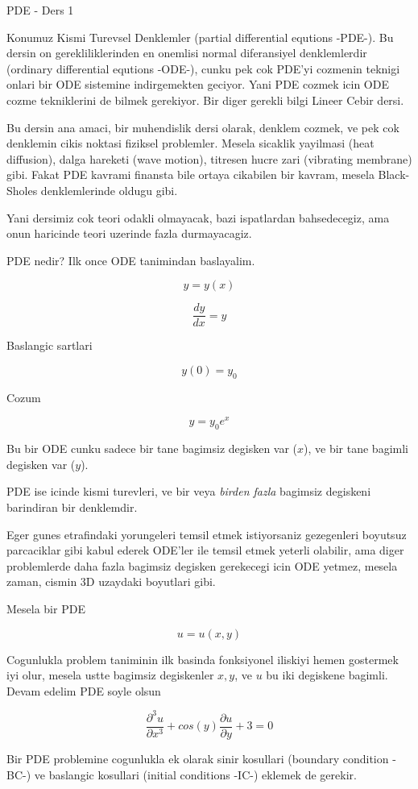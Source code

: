 \documentclass[12pt,fleqn]{article}
\begin{document}
PDE - Ders 1

Konumuz Kismi Turevsel Denklemler (partial differential equtions -PDE-). Bu
dersin on gerekliliklerinden en onemlisi normal diferansiyel denklemlerdir
(ordinary differential equtions -ODE-), cunku pek cok PDE'yi cozmenin
teknigi onlari bir ODE sistemine indirgemekten geciyor. Yani PDE cozmek
icin ODE cozme tekniklerini de bilmek gerekiyor. Bir diger gerekli bilgi
Lineer Cebir dersi.

Bu dersin ana amaci, bir muhendislik dersi olarak, denklem cozmek, ve pek
cok denklemin cikis noktasi fiziksel problemler. Mesela sicaklik yayilmasi
(heat diffusion), dalga hareketi (wave motion), titresen hucre zari
(vibrating membrane) gibi. Fakat PDE kavrami finansta bile ortaya cikabilen
bir kavram, mesela Black-Sholes denklemlerinde oldugu gibi. 

Yani dersimiz cok teori odakli olmayacak, bazi ispatlardan bahsedecegiz,
ama onun haricinde teori uzerinde fazla durmayacagiz. 

PDE nedir? Ilk once ODE tanimindan baslayalim. 

\[ y = y(x) \]

\[ \frac{dy}{dx} = y \]

Baslangic sartlari 

\[ y(0) = y_0 \]

Cozum 

\[ y = y_0e^x \]

Bu bir ODE cunku sadece bir tane bagimsiz degisken var ($x$), ve bir tane
bagimli degisken var ($y$). 

PDE ise icinde kismi turevleri, ve bir veya {\em birden fazla} bagimsiz
degiskeni barindiran bir denklemdir.

Eger gunes etrafindaki yorungeleri temsil etmek istiyorsaniz gezegenleri
boyutsuz parcaciklar gibi kabul ederek ODE'ler ile temsil etmek yeterli
olabilir, ama diger problemlerde daha fazla bagimsiz degisken gerekecegi
icin ODE yetmez, mesela zaman, cismin 3D uzaydaki boyutlari gibi.

Mesela bir PDE

\[ u = u(x,y) \]

Cogunlukla problem taniminin ilk basinda fonksiyonel iliskiyi hemen
gostermek iyi olur, mesela ustte bagimsiz degiskenler $x,y$, ve $u$ bu iki
degiskene bagimli. Devam edelim PDE soyle olsun

\[ \frac{\partial^3 u}{\partial x^3} + 
cos(y)\frac{\partial u}{\partial y} + 3 = 0
\]

Bir PDE problemine cogunlukla ek olarak sinir kosullari (boundary condition
-BC-) ve baslangic kosullari (initial conditions -IC-) eklemek de gerekir. 
\end{document}
